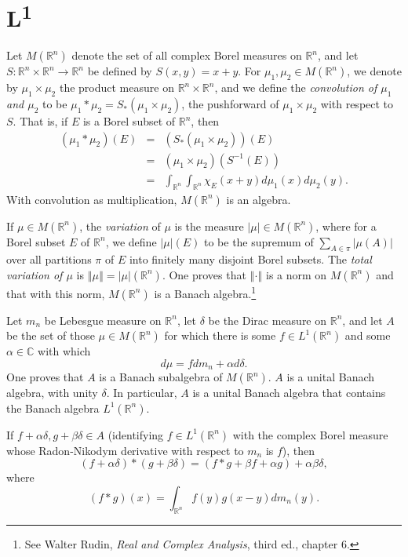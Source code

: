 \documentclass{article}
\newcommand{\norm}[1]{\left\Vert #1 \right\Vert}
\theoremstyle{definition}
\theoremstyle{definition}
\begin{document}
\section{L\textsuperscript{1}}
\label{convolvesection}
Let $M(\mathbb{R}^n)$ denote the set of all complex Borel measures on $\mathbb{R}^n$, 
and let $S:\mathbb{R}^n \times \mathbb{R}^n \to \mathbb{R}^n$ be defined by $S(x,y)=x+y$.
For $\mu_1, \mu_2 \in M(\mathbb{R}^n)$, we denote by $\mu_1 \times \mu_2$ the product measure on
$\mathbb{R}^n \times \mathbb{R}^n$, and we define
the {\em convolution of $\mu_1$ and $\mu_2$} to be $\mu_1 * \mu_2 = S_*(\mu_1 \times \mu_2)$, the pushforward of
$\mu_1 \times \mu_2$ with respect to $S$. That is,
if $E$ is a Borel subset of $\mathbb{R}^n$, then
\begin{eqnarray*}
(\mu_1 * \mu_2)(E) &=& (S_*(\mu_1 \times \mu_2))(E)\\
&=& (\mu_1 \times \mu_2)(S^{-1}(E))\\
& =& \int_{\mathbb{R}^n} \int_{\mathbb{R}^n} \chi_E(x+y) d\mu_1(x) d\mu_2(y).
\end{eqnarray*}
With convolution as multiplication, $M(\mathbb{R}^n)$ is an algebra.

If $\mu \in M(\mathbb{R}^n)$, the {\em variation} of $\mu$ is the measure $|\mu| \in M(\mathbb{R}^n)$, where for a Borel subset $E$ of $\mathbb{R}^n$,
we define $|\mu|(E)$ to be the supremum of $\sum_{A \in \pi} |\mu(A)|$ over all partitions $\pi$ of $E$ into finitely many disjoint Borel subsets.
The {\em total variation of $\mu$} is $\norm{\mu}=|\mu|(\mathbb{R}^n)$. One proves that $\norm{\cdot}$ is a norm on $M(\mathbb{R}^n)$ and that
with this norm, $M(\mathbb{R}^n)$ is a Banach algebra.\footnote{See
Walter Rudin, {\em Real and Complex Analysis}, third ed., chapter 6.}
 

Let $m_n$ be Lebesgue measure on $\mathbb{R}^n$,  let $\delta$ be the Dirac  measure on $\mathbb{R}^n$,
and let $A$ be the set of those $\mu \in M(\mathbb{R}^n)$ for which there is some $f \in L^1(\mathbb{R}^n)$ and some $\alpha \in \mathbb{C}$
with which
\[
d\mu = fdm_n + \alpha d\delta.
\]
One proves that $A$ is a Banach subalgebra of $M(\mathbb{R}^n)$. $A$ is a unital Banach algebra, with unity $\delta$.
In particular, $A$ is a unital Banach algebra that contains
the Banach algebra $L^1(\mathbb{R}^n)$.

If $f+\alpha \delta, g+\beta \delta \in A$ (identifying $f \in L^1(\mathbb{R}^n)$ with the complex Borel measure whose
Radon-Nikodym derivative with respect to $m_n$ is $f$), then
\begin{equation}
(f+\alpha \delta)*(g+\beta \delta) = (f*g+\beta f + \alpha g) + \alpha \beta \delta,
\label{convolveproduct}
\end{equation}
where 
\[
(f*g)(x) = \int_{\mathbb{R}^n} f(y)g(x-y) dm_n(y).
\]
\end{document}
